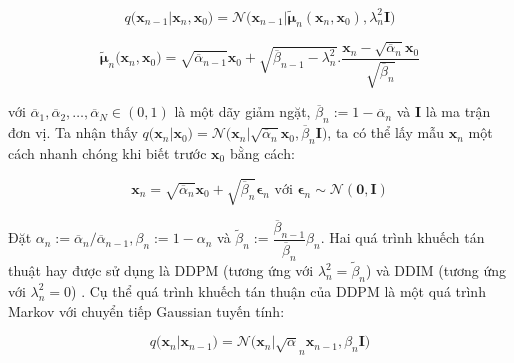 \documentclass[14pt, a4paper]{article}
\numberwithin{equation}{section}
\numberwithin{figure}{section}
\numberwithin{dl}{section}
\numberwithin{md}{section}
\numberwithin{bd}{section}
\numberwithin{dn}{section}
\numberwithin{hq}{section}
\begin{document}
    \begin{equation} \label{eq:Groundtruth-Reverse-Process}
        q\big( \boldsymbol{x}_{n-1} \vert \boldsymbol{x}_n, \boldsymbol{x}_0 \big)=\mathcal{N} \big( \boldsymbol{x}_{n-1} \vert \tilde{\boldsymbol{\mu}}_n (\boldsymbol{x}_n, \boldsymbol{x}_0), \lambda_n^2 \boldsymbol{I} \big)
    \end{equation}

    \begin{equation}
        \tilde{\boldsymbol{\mu}}_n \big( \boldsymbol{x}_n, \boldsymbol{x}_0 \big)=\sqrt{\overline{\alpha}_{n-1}}\boldsymbol{x}_0 + \sqrt{\overline{\beta}_{n-1} - \lambda_n^2}.\dfrac{\boldsymbol{x}_n - \sqrt{\overline{\alpha}_n}\boldsymbol{x}_0}{\sqrt{\overline{\beta}_n}}
    \end{equation}

    với $\overline{\alpha}_1, \overline{\alpha}_2, \dots, \overline{\alpha}_N \in (0, 1)$ là một dãy giảm ngặt,
    $\overline{\beta}_n := 1 - \overline{\alpha}_n$ và $\boldsymbol{I}$ là ma trận đơn vị.
    Ta nhận thấy $q\big( \boldsymbol{x}_n \vert \boldsymbol{x}_0 \big)=\mathcal{N} \big( \boldsymbol{x}_n \vert \sqrt{\overline{\alpha}_n} \boldsymbol{x}_0, \overline{\beta}_n \boldsymbol{I} \big)$,
    ta có thể lấy mẫu $\boldsymbol{x}_n$ một cách nhanh chóng khi biết trước $\boldsymbol{x}_0$ bằng cách:

    \begin{equation}
        \boldsymbol{x}_n = \sqrt{\overline{\alpha}_n} \boldsymbol{x}_0 + \sqrt{\overline{\beta}_n} \boldsymbol{\epsilon}_n \text{ với } \boldsymbol{\epsilon}_n \sim \mathcal{N}(\boldsymbol{0}, \boldsymbol{I})
    \end{equation}

    Đặt $\alpha_n := \overline{\alpha}_n / \overline{\alpha}_{n-1}, \beta_n := 1 - \alpha_n$ và $\tilde{\beta}_n := \dfrac{\overline{\beta}_{n-1}}{\overline{\beta}_n}\beta_n$.
    Hai quá trình khuếch tán thuật hay được sử dụng là DDPM (tương ứng với $\lambda_n^2=\tilde{\beta}_n$) \cite{ho2020denoising} và DDIM (tương ứng với $\lambda_n^2 = 0$) \cite{song2020denoising}.
    Cụ thể quá trình khuếch tán thuận của DDPM là một quá trình Markov với chuyển tiếp Gaussian tuyến tính:

    \begin{equation}
        q\big( \boldsymbol{x}_n \vert \boldsymbol{x}_{n-1} \big)=\mathcal{N} \big( \boldsymbol{x}_n \vert \sqrt{\alpha}_n \boldsymbol{x}_{n-1}, \beta_n \boldsymbol{I} \big)
    \end{equation}
\end{document}
